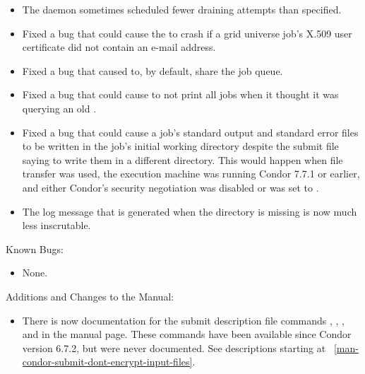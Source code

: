 \begin{itemize}
\item The  daemon sometimes scheduled fewer draining attempts 
than specified.

\item Fixed a bug that could cause the  to crash if a
grid universe job's X.509 user certificate did not contain an e-mail
address.

\item Fixed a bug that caused  to, by default, share the job queue.

\item Fixed a bug that could cause  to not print all jobs when
it thought it was querying an old .

\item Fixed a bug that could cause a job's standard output and standard
error files to be written in the job's initial working directory despite
the submit file saying to write them in a different directory.
This would happen when file transfer was used, the execution machine was
running Condor 7.7.1 or earlier, and either Condor's security negotiation
was disabled or  was
set to .

\item The log message that is generated when the  directory
is missing is now much less inscrutable.

\end{itemize}

\noindent Known Bugs:

\begin{itemize}

\item None.

\end{itemize}

\noindent Additions and Changes to the Manual:

\begin{itemize}

\item There is now documentation for the submit description file commands
,
,
, and
 in the 
manual page.
These commands have been available since Condor version 6.7.2,
but were never documented.
See descriptions starting at
~\ref{man-condor-submit-dont-encrypt-input-files}.


\end{itemize}


